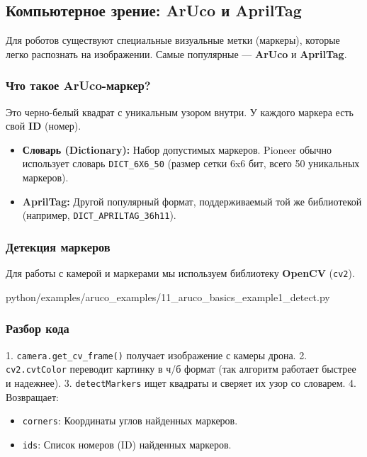 \subsection{Компьютерное зрение: ArUco и AprilTag}

Для роботов существуют специальные визуальные метки (маркеры), которые легко распознать на изображении. Самые популярные — \textbf{ArUco} и \textbf{AprilTag}.

\subsubsection*{Что такое ArUco-маркер?}
Это черно-белый квадрат с уникальным узором внутри. У каждого маркера есть свой \textbf{ID} (номер).
\begin{itemize}
    \item \textbf{Словарь (Dictionary):} Набор допустимых маркеров. Pioneer обычно использует словарь \texttt{DICT\_6X6\_50} (размер сетки 6x6 бит, всего 50 уникальных маркеров).
    \item \textbf{AprilTag:} Другой популярный формат, поддерживаемый той же библиотекой (например, \texttt{DICT\_APRILTAG\_36h11}).
\end{itemize}

\subsubsection*{Детекция маркеров}
Для работы с камерой и маркерами мы используем библиотеку \textbf{OpenCV} (\texttt{cv2}).

\begin{codefile}[python]{python/examples/aruco_examples/11_aruco_basics_example1_detect.py}
\end{codefile}

\subsubsection*{Разбор кода}
1. \texttt{camera.get\_cv\_frame()} получает изображение с камеры дрона.
2. \texttt{cv2.cvtColor} переводит картинку в ч/б формат (так алгоритм работает быстрее и надежнее).
3. \texttt{detectMarkers} ищет квадраты и сверяет их узор со словарем.
4. Возвращает:
   \begin{itemize}
       \item \texttt{corners}: Координаты углов найденных маркеров.
       \item \texttt{ids}: Список номеров (ID) найденных маркеров.
   \end{itemize}


